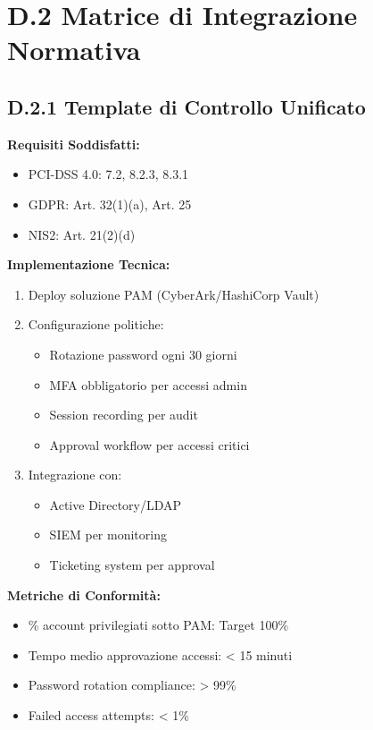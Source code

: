 \section{D.2 Matrice di Integrazione Normativa}

\subsection{D.2.1 Template di Controllo Unificato}

\begin{tcolorbox}[
    colback=blue!5!white,
    colframe=blue!75!black,
    title={\textbf{Controllo Unificato CU-001: Gestione Accessi Privilegiati}},
    fonttitle=\bfseries,
    boxrule=1.5pt,
    arc=2mm,
    breakable
]
\textbf{Requisiti Soddisfatti:}
\begin{itemize}
    \item PCI-DSS 4.0: 7.2, 8.2.3, 8.3.1
    \item GDPR: Art. 32(1)(a), Art. 25
    \item NIS2: Art. 21(2)(d)
\end{itemize}

\textbf{Implementazione Tecnica:}
\begin{enumerate}
    \item Deploy soluzione PAM (CyberArk/HashiCorp Vault)
    \item Configurazione politiche:
    \begin{itemize}
        \item Rotazione password ogni 30 giorni
        \item MFA obbligatorio per accessi admin
        \item Session recording per audit
        \item Approval workflow per accessi critici
    \end{itemize}
    \item Integrazione con:
    \begin{itemize}
        \item Active Directory/LDAP
        \item SIEM per monitoring
        \item Ticketing system per approval
    \end{itemize}
\end{enumerate}

\textbf{Metriche di Conformità:}
\begin{itemize}
    \item \% account privilegiati sotto PAM: Target 100\%
    \item Tempo medio approvazione accessi: < 15 minuti
    \item Password rotation compliance: > 99\%
    \item Failed access attempts: < 1\%
\end{itemize}


\end{tcolorbox}
